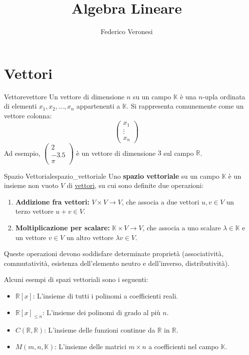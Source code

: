 \documentclass{article}
\title{Algebra Lineare}
\author{Federico Veronesi}
\begin{document}
\maketitle

{
    \hypersetup{linkcolor=black}
    \tableofcontents
}

\section{Vettori}

\begin{definition}{Vettore}{vettore}
    Un vettore di dimensione $n$ su un campo $\mathbb{K}$ è una $n$-upla ordinata di elementi $x_1, x_2, \dots, x_n$ appartenenti a $\mathbb{K}$.
    Si rappresenta comunemente come un vettore colonna:
    \[ \begin{pmatrix} x_1 \\ \vdots \\ x_n \end{pmatrix} \]
    Ad esempio, $\begin{pmatrix} 2 \\ -3.5 \\ \pi \end{pmatrix}$ è un vettore di dimensione $3$ sul campo $\mathbb{R}$.
\end{definition}

\begin{definition}{Spazio Vettoriale}{spazio_vettoriale}
    Uno \textbf{spazio vettoriale} su un campo $\mathbb{K}$ è un insieme non vuoto $V$ di \hyperref[def:vettore]{vettori}, su cui sono definite due operazioni:
    \begin{enumerate}
        \item \textbf{Addizione fra vettori:} $V \times V \to V$, che associa a due vettori $u, v \in V$ un terzo vettore $u+v \in V$.
        \item \textbf{Moltiplicazione per scalare:} $\mathbb{K} \times V \to V$, che associa a uno scalare $\lambda \in \mathbb{K}$ e un vettore $v \in V$ un altro vettore $\lambda v \in V$.
    \end{enumerate}
    Queste operazioni devono soddisfare determinate proprietà (associatività, commutatività, esistenza dell'elemento neutro e dell'inverso, distributività).
\end{definition}

Alcuni esempi di spazi vettoriali sono i seguenti:
\begin{itemize}
    \item $\mathbb{R}[x]$: L'insieme di tutti i polinomi a coefficienti reali.
    \item $\mathbb{R}[x]_{\le n}$: L'insieme dei polinomi di grado al più $n$.
    \item $C(\mathbb{R}, \mathbb{R})$: L'insieme delle funzioni continue da $\mathbb{R}$ in $\mathbb{R}$.
    \item $M(m, n, \mathbb{K})$: L'insieme delle matrici $m \times n$ a coefficienti nel campo $\mathbb{K}$.
\end{itemize}
\end{document}
